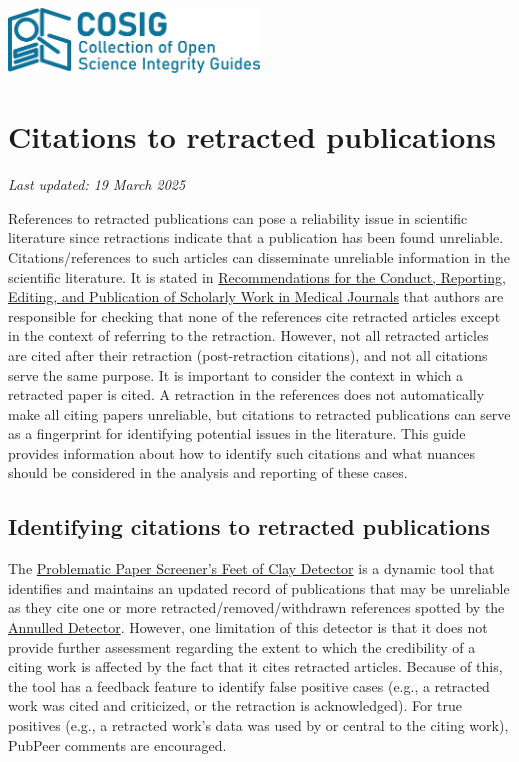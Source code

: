 \documentclass[letterpaper, 12pt]{article}
\begin{document}
\flushleft
\includegraphics[width=0.5\textwidth]{img/home/241017_final_logo_mockup.png}

\section*{Citations to retracted publications}
\textit{Last updated: 19 March 2025}

References to retracted publications can pose a reliability issue in scientific literature since retractions indicate that a publication has been found unreliable. Citations/references to such articles can disseminate unreliable information in the scientific literature. It is stated in \href{https://www.icmje.org/icmje-recommendations.pdf}{Recommendations for the Conduct, Reporting, Editing, and Publication of Scholarly Work in Medical Journals} that authors are responsible for checking that none of the references cite retracted articles except in the context of referring to the retraction. 
However, not all retracted articles are cited after their retraction (post-retraction citations), and not all citations serve the same purpose. It is important to consider the context in which a retracted paper is cited. A retraction in the references does not automatically make all citing papers unreliable, but citations to retracted publications can serve as a fingerprint for identifying potential issues in the literature. This guide provides information about how to identify such citations and what nuances should be considered in the analysis and reporting of these cases. 

\subsection*{Identifying citations to retracted publications}
The \href{https://dbrech.irit.fr/pls/apex/f?p=9999:31}{Problematic Paper Screener’s Feet of Clay Detector} is a dynamic tool that identifies and maintains an updated record of publications that may be unreliable as they cite one or more  retracted/removed/withdrawn references spotted by the \href{https://www.irit.fr/~Guillaume.Cabanac/problematic-paper-screener/annulled}{Annulled Detector}. However, one limitation of this detector is that it does not provide further assessment regarding the extent to which the credibility of a citing work is affected by the fact that it cites retracted articles. Because of this, the tool has a feedback feature to identify false positive cases (e.g., a retracted work was cited and criticized, or the retraction is acknowledged). For true positives (e.g., a retracted work’s data was used by or central to the citing work), PubPeer comments are encouraged. 
\end{document}
